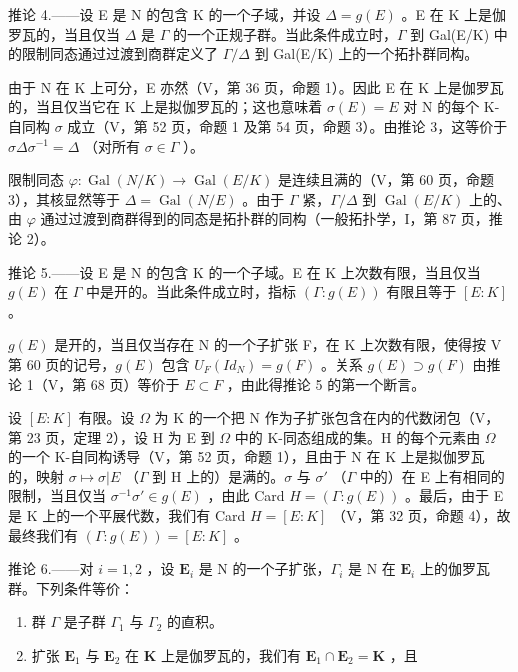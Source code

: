 推论 4.——设 E 是 N 的包含 K 的一个子域，并设 \(\Delta = g(E)\) 。E 在 K 上是伽罗瓦的，当且仅当 \(\Delta\) 是 \(\Gamma\) 的一个正规子群。当此条件成立时，\(\Gamma\) 到 Gal(E/K) 中的限制同态通过过渡到商群定义了 \(\Gamma/\Delta\) 到 Gal(E/K) 上的一个拓扑群同构。

由于 N 在 K 上可分，E 亦然（V，第 36 页，命题 1）。因此 E 在 K 上是伽罗瓦的，当且仅当它在 K 上是拟伽罗瓦的；这也意味着 \(\sigma(E) = E\) 对 N 的每个 K-自同构 \(\sigma\) 成立（V，第 52 页，命题 1 及第 54 页，命题 3）。由推论 3，这等价于 \(\sigma\Delta\sigma^{-1} = \Delta\) （对所有 \(\sigma \in \Gamma\) ）。

限制同态 \(\varphi: \operatorname{Gal}(N/K) \to \operatorname{Gal}(E/K)\) 是连续且满的（V，第 60 页，命题 3），其核显然等于 \(\Delta = \operatorname{Gal}(N/E)\) 。由于 \(\Gamma\) 紧，\(\Gamma/\Delta\) 到 \(\operatorname{Gal}(E/K)\) 上的、由 \(\varphi\) 通过过渡到商群得到的同态是拓扑群的同构（一般拓扑学，I，第 87 页，推论 2）。

推论 5.——设 E 是 N 的包含 K 的一个子域。E 在 K 上次数有限，当且仅当 \(g(E)\) 在 \(\Gamma\) 中是开的。当此条件成立时，指标 \((\Gamma:g(E))\) 有限且等于 \([E:K]\) 。

\(g(E)\) 是开的，当且仅当存在 N 的一个子扩张 F，在 K 上次数有限，使得按 V 第 60 页的记号，\(g(E)\) 包含 \(U_{F}(Id_{N}) = g(F)\) 。关系 \(g(E) \supset g(F)\) 由推论 1（V，第 68 页）等价于 \(E \subset F\) ，由此得推论 5 的第一个断言。

设 \([E:K]\) 有限。设 \(\Omega\) 为 K 的一个把 N 作为子扩张包含在内的代数闭包（V，第 23 页，定理 2），设 H 为 E 到 \(\Omega\) 中的 K-同态组成的集。H 的每个元素由 \(\Omega\) 的一个 K-自同构诱导（V，第 52 页，命题 1），且由于 N 在 K 上是拟伽罗瓦的，映射 \(\sigma\mapsto\sigma|E\) （\(\Gamma\) 到 H 上的）是满的。\(\sigma\) 与 \(\sigma'\) （\(\Gamma\) 中的）在 E 上有相同的限制，当且仅当 \(\sigma^{-1}\sigma'\in g(E)\) ，由此 Card \(H=(\Gamma:g(E))\) 。最后，由于 E 是 K 上的一个平展代数，我们有 Card \(H=[E:K]\) （V，第 32 页，命题 4），故最终我们有 \((\Gamma:g(E))=[E:K]\) 。

推论 6.——对 \(i=1,2\) ，设 \(\mathbf{E}_{i}\) 是 N 的一个子扩张，\(\Gamma_{i}\) 是 N 在 \(\mathbf{E}_{i}\) 上的伽罗瓦群。下列条件等价：

\begin{enumerate}
\def\labelenumi{\alph{enumi})}
\item
  群 \(\Gamma\) 是子群 \(\Gamma_1\) 与 \(\Gamma_2\) 的直积。
\item
  扩张 \(\mathbf{E}_1\) 与 \(\mathbf{E}_2\) 在 \(\mathbf{K}\) 上是伽罗瓦的，我们有 \(\mathbf{E}_1 \cap \mathbf{E}_2 = \mathbf{K}\) ，且
\end{enumerate}

